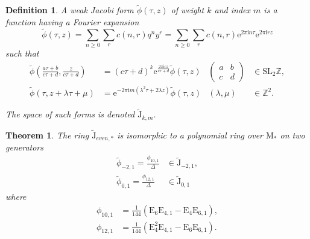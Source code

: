 \documentclass[uplatex,dvipdfmx]{jsarticle}
\newtheorem{definition}{Definition}[section]
\newtheorem{theorem}{Theorem}[section]
\begin{document}
\begin{definition}
    A \textit{weak Jacobi form} 
    $\tilde{\phi} \left( \tau, z \right)$
    of weight
    $k$
    and index
    $m$
    is a function having a Fourier expansion
    \begin{equation}
        \tilde{\phi} \left( \tau, z \right)
        =
        \sum_{n \geq 0}
        \sum_{r}
        c\left( n, r \right)
        q^ny^r
        =
        \sum_{n \geq 0}
        \sum_{r}
        c\left( n, r \right)
        \mathrm{e}^{2 \pi \mathrm{i} n \tau}
        \mathrm{e}^{2 \pi \mathrm{i} r z}
    \end{equation}
    such that
    \begin{align}
        \tilde{\phi}
        \left( 
            \frac{a \tau + b}{c \tau + d},
            \frac{z}         {c \tau + d}
        \right)
        &=
        (c \tau + d)^k
        \mathrm{e}^{\frac{2 \pi \mathrm{i} cz}{c \tau + d}}
        \tilde{\phi}
        \left( \tau, z \right)
        &\begin{pmatrix}
            a &b \\
            c &d 
        \end{pmatrix}
        &\in \mathrm{SL}_2{\mathbb{Z}},\\
        \tilde{\phi}
        \left( 
            \tau,
            z + \lambda \tau + \mu
        \right)
        &=
        \mathrm{e}
        ^{-2 \pi \mathrm{i} m(\lambda^2 \tau + 2 \lambda z)}
        \tilde{\phi}
        \left( \tau, z \right)
        &\left( \lambda, \mu \right)
        &\in \mathbb{Z}^2.
    \end{align}

    The space of such forms is denoted
    $\tilde{\mathrm{J}}_{k, m}$.
\end{definition}

\begin{theorem}
    The ring
    $\tilde{\mathrm{J}}_{even, *}$ 
    is isomorphic to a polynomial ring over
    $\mathrm{M}_*$
    on two generators
    \begin{align}
        \tilde{\phi}_{-2, 1}
        =
        \frac{\phi_{10, 1}}{\Delta}
        &\in
        \tilde{\mathrm{J}}_{-2, 1},\\
        \tilde{\phi}_{0, 1}
        =
        \frac{\phi_{12, 1}}{\Delta}
        &\in
        \tilde{\mathrm{J}}_{0, 1}
    \end{align}
    where
    \begin{align}
        \phi_{10, 1}
        &=
        \frac{1}{144}
        (\mathrm{E}_6 \mathrm{E}_{4, 1}
        -
        \mathrm{E}_4 \mathrm{E}_{6, 1}),\\
        \phi_{12, 1}
        &=
        \frac{1}{144}
        (\mathrm{E}_4^2 \mathrm{E}_{4, 1}
        -
        \mathrm{E}_6 \mathrm{E}_{6, 1}).
    \end{align}
\end{theorem}
\end{document}
